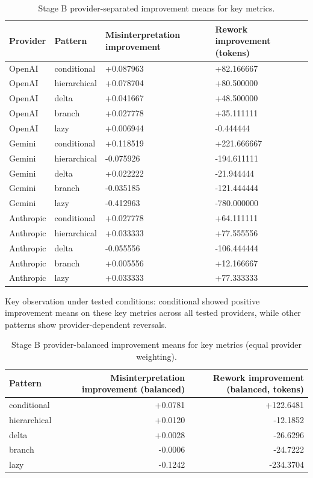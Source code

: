 \documentclass[11pt,a4paper]{article}
\begin{document}
\begin{table}[h]
\centering
\small
\begin{tabular}{llll}
\toprule
Provider & Pattern & Misinterpretation improvement & Rework improvement (tokens) \\
\midrule
OpenAI & conditional & +0.087963 & +82.166667 \\
OpenAI & hierarchical & +0.078704 & +80.500000 \\
OpenAI & delta & +0.041667 & +48.500000 \\
OpenAI & branch & +0.027778 & +35.111111 \\
OpenAI & lazy & +0.006944 & -0.444444 \\
\midrule
Gemini & conditional & +0.118519 & +221.666667 \\
Gemini & hierarchical & -0.075926 & -194.611111 \\
Gemini & delta & +0.022222 & -21.944444 \\
Gemini & branch & -0.035185 & -121.444444 \\
Gemini & lazy & -0.412963 & -780.000000 \\
\midrule
Anthropic & conditional & +0.027778 & +64.111111 \\
Anthropic & hierarchical & +0.033333 & +77.555556 \\
Anthropic & delta & -0.055556 & -106.444444 \\
Anthropic & branch & +0.005556 & +12.166667 \\
Anthropic & lazy & +0.033333 & +77.333333 \\
\bottomrule
\end{tabular}
\caption{Stage B provider-separated improvement means for key metrics.}
\label{tab:stageb_key}
\end{table}

Key observation under tested conditions: conditional showed positive improvement means on these key metrics across all tested providers, while other patterns show provider-dependent reversals.

\begin{table}[h]
\centering
\small
\begin{tabular}{lrr}
\toprule
Pattern & Misinterpretation improvement (balanced) & Rework improvement (balanced, tokens) \\
\midrule
conditional & +0.0781 & +122.6481 \\
hierarchical & +0.0120 & -12.1852 \\
delta & +0.0028 & -26.6296 \\
branch & -0.0006 & -24.7222 \\
lazy & -0.1242 & -234.3704 \\
\bottomrule
\end{tabular}
\caption{Stage B provider-balanced improvement means for key metrics (equal provider weighting).}
\label{tab:stageb_key_balanced}
\end{table}
\end{document}
